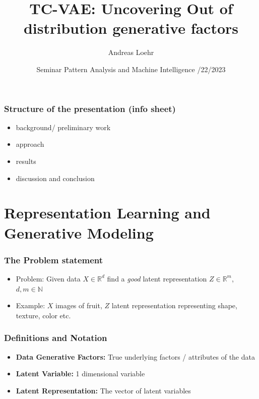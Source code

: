 \documentclass{beamer}
\title[]{TC-VAE: Uncovering Out of distribution generative factors}
\author{Andreas Loehr}
\institute{Goethe Universität Frankfurt a.M.}
\date{
  \vspace{0.2cm}
  Seminar Pattern Analysis and Machine Intelligence
  \vspace{0.4cm}
  \newline 06/22/2023\\
  \vspace{0.3cm} %
  }
\theoremstyle{definition}
\begin{document}
  \AtBeginSection[]
  {
      \begin{frame}
          \tableofcontents[currentsection]
      \end{frame}
    }
  \begin{frame}
    \begin{titlepage}
    \end{titlepage}
  \end{frame}
  \begin{frame}
    \frametitle{Structure of the presentation (info sheet)}
    \begin{itemize}
      \item background/ preliminary work
      \item approach
      \item results
      \item discussion and conclusion
    \end{itemize}
  \end{frame}
  \section{Representation Learning and Generative Modeling}
    \begin{frame}
      \frametitle{The Problem statement}
      \begin{itemize}
        \item Problem: Given data $X \in \mathbb{R}^{d}$ find a \textit{good} latent representation $Z \in \mathbb{R}^{m}$, $d, m \in \mathbb{N}$
        \item Example: $X$ images of fruit, $Z$ latent representation representing shape, texture, color etc.
        \end{itemize}
      \end{frame}

      \begin{frame}
        \frametitle{Definitions and Notation}
        \begin{itemize}
          \item \textbf{Data Generative Factors:} True underlying factors / attributes of the data
          \item \textbf{Latent Variable:} 1 dimensional variable
          \item \textbf{Latent Representation:} The vector of latent variables
        \end{itemize}
      \end{frame}
\end{document}
